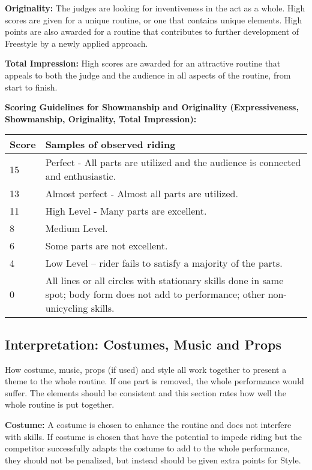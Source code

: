 \textbf{Originality:} The judges are looking for inventiveness in the act as a whole.
High scores are given for a unique routine, or one that contains unique elements.
High points are also awarded for a routine that contributes to further development of Freestyle by a newly applied approach.

\textbf{Total Impression:} High scores are awarded for an attractive routine that appeals to both the judge and the audience in all aspects of the routine, from start to finish.

\begin{minipage}{\textwidth}
\textbf{Scoring Guidelines for Showmanship and Originality (Expressiveness, Showmanship, Originality, Total Impression):} \\

\begin{tabular}{|l|p{12.5cm}|}
\hline
\textbf{Score} & \textbf{Samples of observed riding} \\
\hline
15 & Perfect - All parts are utilized and the audience is connected and enthusiastic. \\
\hline
13 & Almost perfect - Almost all parts are utilized. \\
\hline
11 & High Level - Many parts are excellent. \\
\hline
8 & Medium Level. \\
\hline
6 & Some parts are not excellent. \\
\hline
4 & Low Level – rider fails to satisfy a majority of the parts. \\
\hline
0 & All lines or all circles with stationary skills done in same spot; body form does not add to performance; other non-unicycling skills. \\
\hline
\end{tabular}
\end{minipage}

\subsection{Interpretation: Costumes, Music and Props}
How costume, music, props (if used) and style all work together to present a theme to the whole routine.
If one part is removed, the whole performance would suffer.
The elements should be consistent and this section rates how well the whole routine is put together.

\textbf{Costume:} A costume is chosen to enhance the routine and does not interfere with skills.
If costume is chosen that have the potential to impede riding but the competitor successfully adapts the costume to add to the whole performance, they should not be penalized, but instead should be given extra points for Style.

